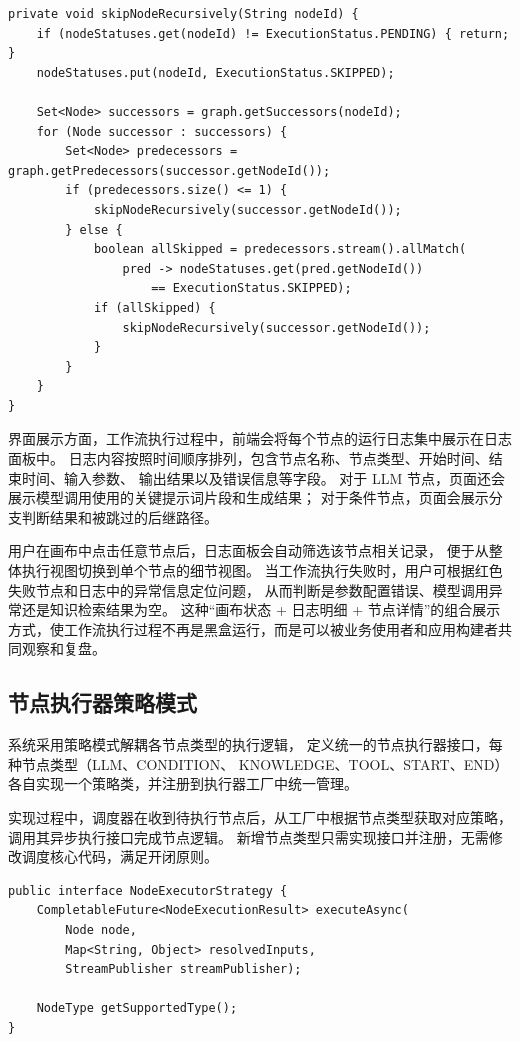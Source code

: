 \begin{lstlisting}[style=java, caption={Execution.skipNodeRecursively() 条件分支路径剪枝}]
private void skipNodeRecursively(String nodeId) {
    if (nodeStatuses.get(nodeId) != ExecutionStatus.PENDING) { return; }
    nodeStatuses.put(nodeId, ExecutionStatus.SKIPPED);

    Set<Node> successors = graph.getSuccessors(nodeId);
    for (Node successor : successors) {
        Set<Node> predecessors = graph.getPredecessors(successor.getNodeId());
        if (predecessors.size() <= 1) {
            skipNodeRecursively(successor.getNodeId());
        } else {
            boolean allSkipped = predecessors.stream().allMatch(
                pred -> nodeStatuses.get(pred.getNodeId())
                    == ExecutionStatus.SKIPPED);
            if (allSkipped) {
                skipNodeRecursively(successor.getNodeId());
            }
        }
    }
}
\end{lstlisting}


界面展示方面，工作流执行过程中，前端会将每个节点的运行日志集中展示在日志面板中。
日志内容按照时间顺序排列，包含节点名称、节点类型、开始时间、结束时间、输入参数、
输出结果以及错误信息等字段。
对于 LLM 节点，页面还会展示模型调用使用的关键提示词片段和生成结果；
对于条件节点，页面会展示分支判断结果和被跳过的后继路径。

用户在画布中点击任意节点后，日志面板会自动筛选该节点相关记录，
便于从整体执行视图切换到单个节点的细节视图。
当工作流执行失败时，用户可根据红色失败节点和日志中的异常信息定位问题，
从而判断是参数配置错误、模型调用异常还是知识检索结果为空。
这种“画布状态 + 日志明细 + 节点详情”的组合展示方式，使工作流执行过程不再是黑盒运行，而是可以被业务使用者和应用构建者共同观察和复盘。


\subsection{节点执行器策略模式}


系统采用策略模式解耦各节点类型的执行逻辑，
定义统一的节点执行器接口，每种节点类型（LLM、CONDITION、
KNOWLEDGE、TOOL、START、END）各自实现一个策略类，并注册到执行器工厂中统一管理。

实现过程中，调度器在收到待执行节点后，从工厂中根据节点类型获取对应策略，
调用其异步执行接口完成节点逻辑。
新增节点类型只需实现接口并注册，无需修改调度核心代码，满足开闭原则。


\begin{lstlisting}[style=java, caption={NodeExecutorStrategy 接口定义}]
public interface NodeExecutorStrategy {
    CompletableFuture<NodeExecutionResult> executeAsync(
        Node node,
        Map<String, Object> resolvedInputs,
        StreamPublisher streamPublisher);

    NodeType getSupportedType();
}
\end{lstlisting}

